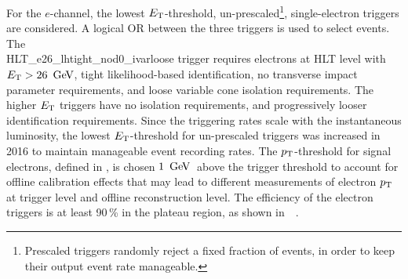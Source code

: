 \begin{table}[htb]
\centering
{}
\caption[Summary of lepton triggers used]{Summary of the electron and \MET triggers used in this search.}
\label{tab:trig_sel}
\end{table}

For the $e$-channel, the lowest $E_{\rm T}$-threshold, un-prescaled\footnote{
Prescaled triggers randomly reject a fixed fraction of events, in order to keep their output event rate manageable.
}, single-electron triggers are considered. A logical OR between the three triggers is used to select events. The\\ HLT\_e26\_lhtight\_nod0\_ivarloose trigger requires electrons at HLT level with $E_{\rm T} > 26\, \GeV$, tight likelihood-based identification, no transverse impact parameter requirements, and loose variable cone isolation requirements. The higher $E_{\rm T}$ triggers have no isolation requirements, and progressively looser identification requirements. Since the triggering rates scale with the instantaneous luminosity, the lowest $E_{\rm T}$-threshold for un-prescaled triggers was increased in 2016 to maintain manageable event recording rates. The $p_{\text{T}}$-threshold for signal electrons, defined in \Sect{\ref{ch:objreco:el}}, is chosen $1\,\GeV$\, above the trigger threshold to account for offline calibration effects that may lead to different measurements of electron $p_{\text{T}}$ at trigger level and offline reconstruction level. The efficiency of the electron triggers is at least 90\,\% in the plateau region, as shown in~\Fig{\ref{fig:trig_eff}}~\cite{trig_eff_2016}.

